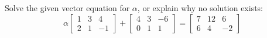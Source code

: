 Solve the given vector equation for $\alpha$, or explain why no solution exists:
%
\begin{equation*}
\alpha\begin{bmatrix} 1 & 3 & 4 \\ 2 & 1 & -1 \end{bmatrix} + 
\begin{bmatrix} 4 & 3 & -6 \\ 0 & 1 & 1 \end{bmatrix} 
=
\begin{bmatrix} 7 & 12 & 6 \\ 6 & 4 & -2 \end{bmatrix}
\end{equation*}
%